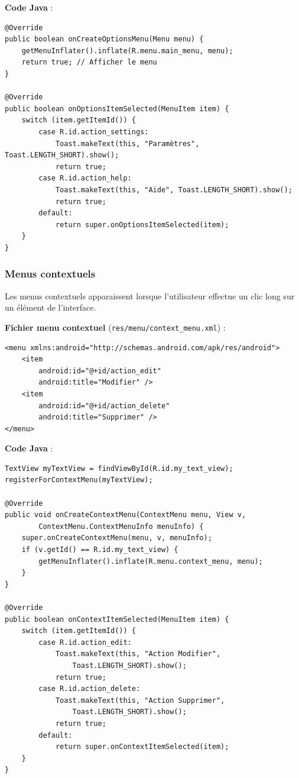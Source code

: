 \documentclass[11pt,a4paper]{article}
\begin{document}
\textbf{Code Java} :
\begin{lstlisting}
@Override
public boolean onCreateOptionsMenu(Menu menu) {
    getMenuInflater().inflate(R.menu.main_menu, menu);
    return true; // Afficher le menu
}

@Override
public boolean onOptionsItemSelected(MenuItem item) {
    switch (item.getItemId()) {
        case R.id.action_settings:
            Toast.makeText(this, "Paramètres", Toast.LENGTH_SHORT).show();
            return true;
        case R.id.action_help:
            Toast.makeText(this, "Aide", Toast.LENGTH_SHORT).show();
            return true;
        default:
            return super.onOptionsItemSelected(item);
    }
}
\end{lstlisting}

\subsubsection{Menus contextuels}

Les menus contextuels apparaissent lorsque l'utilisateur effectue un clic long sur un élément de l'interface.

\textbf{Fichier menu contextuel} (\texttt{res/menu/context\_menu.xml}) :
\begin{lstlisting}[style=XML]
<menu xmlns:android="http://schemas.android.com/apk/res/android">
    <item
        android:id="@+id/action_edit"
        android:title="Modifier" />
    <item
        android:id="@+id/action_delete"
        android:title="Supprimer" />
</menu>
\end{lstlisting}

\textbf{Code Java} :
\begin{lstlisting}
TextView myTextView = findViewById(R.id.my_text_view);
registerForContextMenu(myTextView);

@Override
public void onCreateContextMenu(ContextMenu menu, View v, 
        ContextMenu.ContextMenuInfo menuInfo) {
    super.onCreateContextMenu(menu, v, menuInfo);
    if (v.getId() == R.id.my_text_view) {
        getMenuInflater().inflate(R.menu.context_menu, menu);
    }
}

@Override
public boolean onContextItemSelected(MenuItem item) {
    switch (item.getItemId()) {
        case R.id.action_edit:
            Toast.makeText(this, "Action Modifier", 
                Toast.LENGTH_SHORT).show();
            return true;
        case R.id.action_delete:
            Toast.makeText(this, "Action Supprimer", 
                Toast.LENGTH_SHORT).show();
            return true;
        default:
            return super.onContextItemSelected(item);
    }
}
\end{lstlisting}
\end{document}
